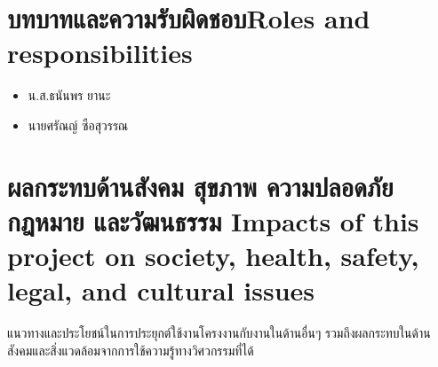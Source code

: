 \section{\ifcpe บทบาทและความรับผิดชอบ\else Roles and responsibilities\fi}
\begin{itemize}
    \item น.ส.ธนันพร ยานะ
    \item นายศรัณญ์ ซือสุวรรณ
\end{itemize}

\section{\ifcpe%
ผลกระทบด้านสังคม สุขภาพ ความปลอดภัย กฎหมาย และวัฒนธรรม
\else%
Impacts of this project on society, health, safety, legal, and cultural issues
\fi}

แนวทางและประโยชน์ในการประยุกต์ใช้งานโครงงานกับงานในด้านอื่นๆ รวมถึงผลกระทบในด้านสังคมและสิ่งแวดล้อมจากการใช้ความรู้ทางวิศวกรรมที่ได้
